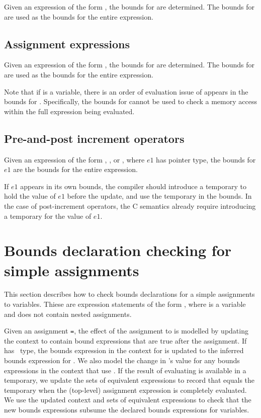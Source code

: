 Given an expression of the form  \code{,} , the
bounds for  are determined. The bounds for  are used
as the bounds for the entire expression.  

\subsection{Assignment expressions}

Given an expression of the form  \code{ = } , the
bounds for  are determined. The bounds for  are used
as the bounds for the entire expression.

Note that if  is a variable,
there is an order of evaluation issue of  appears in the bounds for
.   Specifically, the bounds for  cannot be used to
check a memory access within the full expression being evaluated.

\subsection{Pre-and-post increment operators}
\label{section:inferring-increment-bounds}

Given an expression of the form \code{++}, \code{--},
 \code{++} or \code{--}, where $e1$ has pointer type,
 the bounds for $e1$ are the bounds for the entire expression.
 
 If $e1$ appears in its own bounds, the compiler should introduce a
 temporary to hold the value of $e1$ before the update, and use
 the temporary in the bounds.  In the case of post-increment operators, 
 the C semantics already require  introducing a temporary for the value of $e1$.

\section{Bounds declaration checking for simple assignments}

This section describes how to check bounds declarations for a
simple assignments to variables.  Thiese are expression statements of the
form , where  is a variable and  does
not contain nested assignments.

Given an assignment \lstinline+=+, the effect of the assignment to 
is modelled by updating the context to contain bound expressions that are true
after the assignment.  If  has \arrayptr\ type, the bounds expression in
the context for  is updated to the inferred bounds expression for .
We also model the change in 's
value for any bounds expressions in the context that use .   If the result of 
evaluating  is available in a temporary, we update the sets of equivalent
expressions to record that  equals the temporary when the (top-level) assignment
expression is completely evaluated.
We use the updated context and sets of equivalent expressions to check
that the new bounds expressions subsume the declared bounds expressions for variables.

